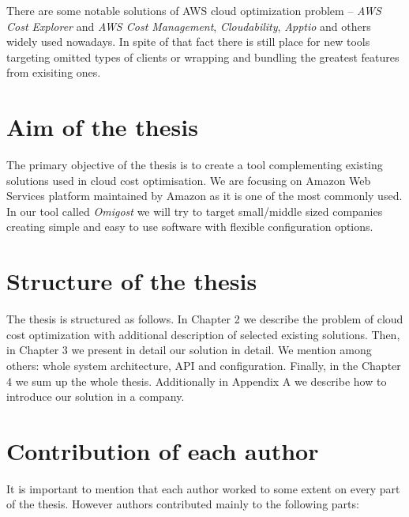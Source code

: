 \documentclass[licencjacka,en]{thesisclass}
\begin{document}
    There are some notable solutions of AWS cloud optimization problem -- \textit{AWS Cost Explorer} and \textit{AWS Cost Management}, \textit{Cloudability}, \textit{Apptio} and others widely used nowadays. In spite of that fact there is still place for new tools targeting omitted types of clients or wrapping and bundling the greatest features from exisiting ones.

    \section{Aim of the thesis}

    The primary objective of the thesis is to create a tool complementing existing solutions used in cloud cost optimisation. We are focusing on Amazon Web Services platform maintained by Amazon as it is one of the most commonly used.
    In our tool called \textit{Omigost} we will try to target small/middle sized companies creating simple and easy to use software with flexible configuration options.

    \section{Structure of the thesis}

    The thesis is structured as follows. In Chapter 2 we describe the problem of cloud cost optimization with additional description of selected existing solutions. Then, in Chapter 3 we present in detail our solution in detail. We mention among others: whole system architecture, API and configuration. Finally, in the Chapter 4 we sum up the whole thesis. Additionally in Appendix A we describe how to introduce our solution in a company.

    \section{Contribution of each author}

    It is important to mention that each author worked to some extent on every part of the thesis. However authors contributed mainly to the following parts:
\end{document}
